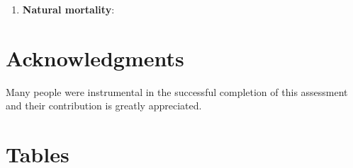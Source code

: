 \documentclass[12pt,]{article}
\begin{document}
\begin{enumerate}

\item \textbf{Natural mortality}: 



\end{enumerate}

\section{Acknowledgments}\label{acknowledgments}

Many people were instrumental in the successful completion of this
assessment and their contribution is greatly appreciated.

\newpage

\FloatBarrier

\section{Tables}\label{tables}
\end{document}
